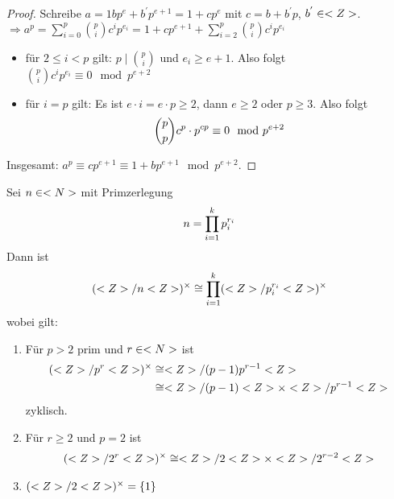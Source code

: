 \begin{proof}
	Schreibe $a= 1 bp^{e} + b^{'}p^{e+1} = 1 + cp^{e}$ mit $c = b + b^{'}p$, $b^{'} \in <Z>$.\\
	$\Rightarrow a^p = \sum_{i=0}^{p} \binom{p}{i} c^i p^{e_i} = 1+cp^{e+1} + \sum_{i=2}^{p} \binom{p}{i} c^i p^{e_i}$
	\begin{itemize}
		\item für $2 \le i < p$ gilt: $p \mid \binom{p}{i}$ und $e_i \ge e + 1$. Also folgt $\binom{p}{i}c^i p^{e_i} \equiv 0 \mod p^{e + 2}$
		\item für $i = p$ gilt: Es ist $e\cdot i = e\cdot p \ge 2$, dann $e \ge 2$ oder $p \ge 3$. Also folgt
		\begin{align}
			\binom{p}{p}c^{p}\cdot p^{cp} \equiv 0 \mod p^{e+2}\notag
		\end{align}
	\end{itemize}
	Insgesamt: $a^p \equiv cp^{e+1} \equiv 1 + bp^{e+1} \mod p^{e+2}$.
\end{proof}

\begin{theorem}
	Sei $n \in <N>$ mit Primzerlegung
	\begin{align}
		n = \prod_{i=1}^{k} p_i^{r_i}\notag
	\end{align}
	Dann ist
	\begin{align}
		(<Z> / n <Z>)^{\times} \cong \prod_{i=1}^{k} (<Z> / p_i^{r_i} <Z>)^{\times}\notag
	\end{align}
	wobei gilt:
	\begin{enumerate}
		\item Für $p > 2$ prim und $r \in <N>$ ist
		\begin{align}
			(<Z> / p^{r}<Z>)^{\times} &\cong <Z> / (p-1)p^{r-1}<Z> \notag \\
			&\cong <Z> / (p-1) <Z> \times <Z> / p^{r-1} <Z> \notag
		\end{align} 
		zyklisch.
		\item Für $r \ge 2$ und $p =2$ ist
		\begin{align}
			(<Z> /2^r <Z>)^{\times} \cong <Z> / 2 <Z> \times <Z> / 2^{r-2}<Z> \notag
		\end{align}
		\item $(<Z> / 2 <Z>)^{\times} = \{1\}$
	\end{enumerate}
\end{theorem}

